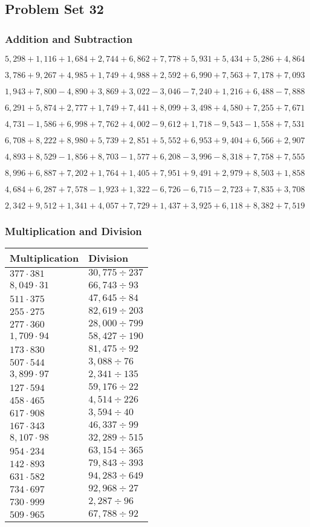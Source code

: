 \hypertarget{problem-set-32-3}{%
\subsection{Problem Set 32}\label{problem-set-32-3}}

\hypertarget{addition-and-subtraction-194}{%
\subsubsection{Addition and
Subtraction}\label{addition-and-subtraction-194}}

\(5,298+1,116+1,684+2,744+6,862+7,778+5,931+5,434+5,286+ 4,864\)

\(3,786+9,267+4,985+1,749+4,988+2,592+6,990+7,563+7,178+7,093\)

\(1,943+7,800-4,890+3,869+3,022-3,046-7,240+1,216+6,488-7,888\)

\(6,291+5,874+2,777+1,749+7,441+8,099+3,498+4,580+7,255+7,671\)

\(4,731-1,586+6,998+7,762+4,002-9,612+1,718-9,543-1,558+7,531\)

\(6,708+8,222+8,980+5,739+2,851+5,552+6,953+9,404+6,566+2,907\)

\(4,893+8,529-1,856+8,703-1,577+6,208-3,996-8,318+7,758+7,555\)

\(8,996+6,887+7,202+1,764+1,405+7,951+9,491+2,979+8,503+1,858\)

\(4,684+6,287+7,578-1,923+1,322-6,726-6,715-2,723+7,835+3,708\)

\(2,342+9,512+1,341+4,057+7,729+1,437+3,925+6,118+8,382+7,519\)

\hypertarget{multiplication-and-division-193}{%
\subsubsection{Multiplication and
Division}\label{multiplication-and-division-193}}

\begin{longtable}[]{@{}ll@{}}
\toprule
Multiplication & Division\tabularnewline
\midrule
\endhead
\(377\cdot381\) & \(30,775÷237\)\tabularnewline
\(8,049\cdot31\) & \(66,743÷93\)\tabularnewline
\(511\cdot375\) & \(47,645÷84\)\tabularnewline
\(255\cdot275\) & \(82,619÷203\)\tabularnewline
\(277\cdot360\) & \(28,000÷799\)\tabularnewline
\(1,709\cdot94\) & \(58,427÷190\)\tabularnewline
\(173\cdot830\) & \(81,475÷92\)\tabularnewline
\(507\cdot544\) & \(3,088÷76\)\tabularnewline
\(3,899\cdot97\) & \(2,341÷135\)\tabularnewline
\(127\cdot594\) & \(59,176÷22\)\tabularnewline
\(458\cdot465\) & \(4,514÷226\)\tabularnewline
\(617\cdot908\) & \(3,594÷40\)\tabularnewline
\(167\cdot343\) & \(46,337÷99\)\tabularnewline
\(8,107\cdot98\) & \(32,289÷515\)\tabularnewline
\(954\cdot234\) & \(63,154÷365\)\tabularnewline
\(142\cdot893\) & \(79,843÷393\)\tabularnewline
\(631\cdot582\) & \(94,283÷649\)\tabularnewline
\(734\cdot697\) & \(92,968÷27\)\tabularnewline
\(730\cdot999\) & \(2,287÷96\)\tabularnewline
\(509\cdot965\) & \(67,788÷92\)\tabularnewline
\bottomrule
\end{longtable}

